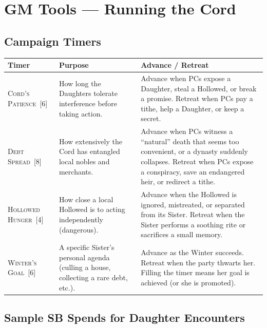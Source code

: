 \documentclass[10pt,twoside]{book}
\newcommand{\timer}[2]{\textsc{#1}~[#2]}
\begin{document}
\chapter{GM Tools --- Running the Cord}

\section{Campaign Timers}

\begin{tabular}{@{}p{}p{}p{}@{}}
\toprule
\textbf{Timer} & \textbf{Purpose} & \textbf{Advance / Retreat} \\
\midrule
\timer{Cord's Patience}{6} & How long the Daughters tolerate interference before taking action. & Advance when PCs expose a Daughter, steal a Hollowed, or break a promise. Retreat when PCs pay a tithe, help a Daughter, or keep a secret. \\
\timer{Debt Spread}{8} & How extensively the Cord has entangled local nobles and merchants. & Advance when PCs witness a ``natural'' death that seems too convenient, or a dynasty suddenly collapses. Retreat when PCs expose a conspiracy, save an endangered heir, or redirect a tithe. \\
\timer{Hollowed Hunger}{4} & How close a local Hollowed is to acting independently (dangerous). & Advance when the Hollowed is ignored, mistreated, or separated from its Sister. Retreat when the Sister performs a soothing rite or sacrifices a small memory. \\
\timer{Winter's Goal}{6} & A specific Sister's personal agenda (culling a house, collecting a rare debt, etc.). & Advance as the Winter succeeds. Retreat when the party thwarts her. Filling the timer means her goal is achieved (or she is promoted). \\
\bottomrule
\end{tabular}

\section{Sample SB Spends for Daughter Encounters}
\end{document}
